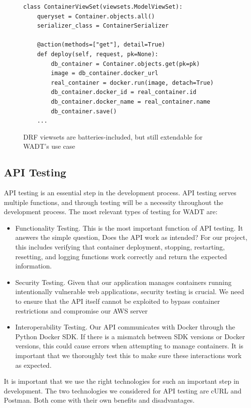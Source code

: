 \documentclass[12pt,titlepage]{article}
\begin{document}
\begin{figure}[H]
	\begin{verbatim}
class ContainerViewSet(viewsets.ModelViewSet):
    queryset = Container.objects.all()
    serializer_class = ContainerSerializer

    @action(methods=["get"], detail=True)
    def deploy(self, request, pk=None):
        db_container = Container.objects.get(pk=pk)
        image = db_container.docker_url
        real_container = docker.run(image, detach=True)
        db_container.docker_id = real_container.id
        db_container.docker_name = real_container.name
        db_container.save()
	...
	\end{verbatim}
	\caption{DRF viewsets are batteries-included, but still extendable for WADT's use case}
	\label{fig:viewset}
\end{figure}


\subsection{API Testing}

API testing is an essential step in the development process. API testing serves multiple functions, and through testing will be a necessity throughout the development process. The most relevant types of testing for WADT are:
\begin{itemize}
\item Functionality Testing. This is the most important function of API testing. It answers the simple question, Does the API work as intended? For our project, this includes verifying that container deployment, stopping, restarting, resetting, and logging functions work correctly and return the expected information. 
\item Security Testing. Given that our application manages containers running intentionally vulnerable web applications, security testing is crucial. We need to ensure that the API itself cannot be exploited to bypass container restrictions and compromise our AWS server
\item Interoperability Testing. Our API communicates with Docker through the Python Docker SDK. If there is a mismatch between SDK versions or Docker versions, this could cause errors when attempting to manage containers. It is important that we thoroughly test this to make sure these interactions work as expected.
\end{itemize}

It is important that we use the right technologies for such an important step in development. The two technologies we considered for API testing are cURL and Postman. Both come with their own benefits and disadvantages.
\end{document}
